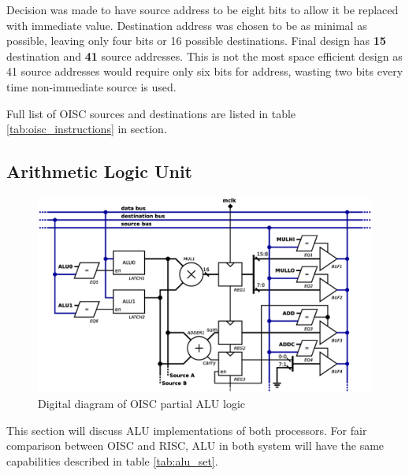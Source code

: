 Decision was made to have source address to be eight bits to allow it be replaced with immediate value. Destination address was chosen to be as minimal as possible, leaving only four bits or 16 possible destinations. Final design has \textbf{15} destination and \textbf{41} source addresses. This is not the most space efficient design as 41 source addresses would require only six bits for address, wasting two bits every time non-immediate source is used.

Full list of OISC sources and destinations are listed in table \ref{tab:oisc_instructions} in  section.
\subsection{Arithmetic Logic Unit}\label{subsec:alu}

\begin{figure}[b]
\centering
\includegraphics[scale=0.35]{../resources/oisc_alu.eps}
\caption{Digital diagram of OISC partial ALU logic}
\label{fig:oisc_alu}
\end{figure}

This section will discuss ALU implementations of both processors. For fair comparison between OISC and RISC, ALU in both system will have the same capabilities described in table \ref{tab:alu_set}.

